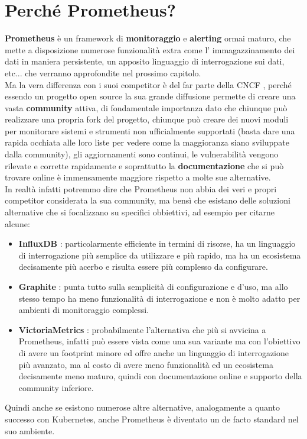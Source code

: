 
\section{Perché Prometheus?}
\textbf{Prometheus} \cite{Prometheus} è un framework di \textbf{monitoraggio} e \textbf{alerting} ormai maturo, che mette a disposizione numerose funzionalità extra come l' immagazzinamento dei dati in maniera persistente, un apposito linguaggio di interrogazione sui dati, etc... che verranno approfondite nel prossimo capitolo.
\\
Ma la vera differenza con i suoi competitor è del far parte della CNCF \cite{CNCF}, perché essendo un progetto open source la sua grande diffusione permette di creare una vasta \textbf{community} attiva, di fondamentale importanza dato che chiunque può realizzare una propria fork del progetto, chiunque può creare dei nuovi moduli per monitorare sistemi e strumenti non ufficialmente supportati (basta dare una rapida occhiata alle loro liste \cite{Prometheus-clients-exporters-list} per vedere come la maggioranza siano sviluppate dalla community), gli aggiornamenti sono continui, le vulnerabilità vengono rilevate e corrette rapidamente e soprattutto la \textbf{documentazione} che si può trovare online è immensamente maggiore rispetto a molte sue alternative. \\
In realtà infatti potremmo dire che Prometheus non abbia dei veri e propri competitor considerata la sua community, ma bensì che esistano delle soluzioni alternative che si focalizzano su specifici obbiettivi, ad esempio per citarne alcune:
\begin{itemize}
    \item \textbf{InfluxDB} \cite{InfluxDB}: particolarmente efficiente in termini di risorse, ha un linguaggio di interrogazione più semplice da utilizzare e più rapido, ma ha un ecosistema decisamente più acerbo e risulta essere più complesso da configurare.
    \item \textbf{Graphite} \cite{Graphite}: punta tutto sulla semplicità di configurazione e d'uso, ma allo stesso tempo ha meno funzionalità di interrogazione e non è molto adatto per ambienti di monitoraggio complessi.
    \item \textbf{VictoriaMetrics} \cite{VictoriaMetrics}: probabilmente l'alternativa che più si avvicina a Prometheus, infatti può essere vista come una sua variante ma con l'obiettivo di avere un footprint minore ed offre anche un linguaggio di interrogazione più avanzato, ma al costo di avere meno funzionalità ed un ecosistema decisamente meno maturo, quindi con documentazione online e supporto della community inferiore.
\end{itemize}
Quindi anche se esistono numerose altre alternative, analogamente a quanto successo con Kubernetes, anche Prometheus è diventato un de facto standard nel suo ambiente.